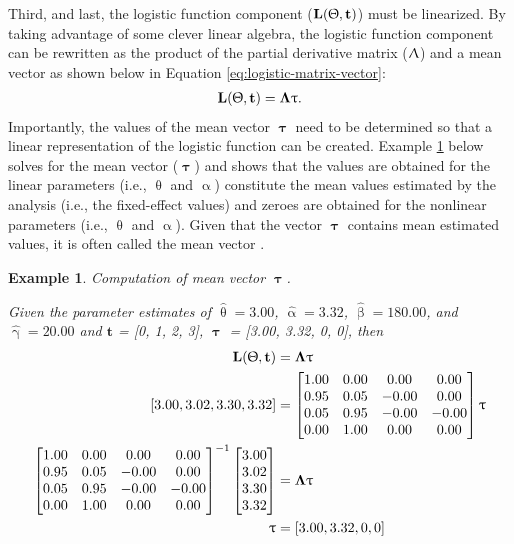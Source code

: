 \documentclass[
12pt, %
twoside,
english]{guelphthesis}
\newtheorem{example}{Example}
\begin{document}
Third, and last, the logistic function component (\(\mathbf{L(\Uptheta, t)}\)) must be linearized. By taking advantage of some clever linear algebra, the logistic function component can be rewritten as the product of the partial derivative matrix (\(\mathbf{\Uplambda}\)) and a mean vector \autocites[\(\mathbf{\uptau}\);][]{shapiro1987,browne1993} as shown below in Equation \ref{eq:logistic-matrix-vector}:
\begin{align}
 \mathbf{L(\Uptheta, t)} = \mathbf{\Lambda\uptau}.
\label{eq:logistic-matrix-vector}
\end{align}
\noindent Importantly, the values of the mean vector \(\mathbf{\uptau}\) need to be determined so that a linear representation of the logistic function can be created. Example \ref{exm:tau-vector} below solves for the mean vector (\(\mathbf{\uptau}\)) and shows that the values are obtained for the linear parameters (i.e., \(\uptheta\) and \(\upalpha\)) constitute the mean values estimated by the analysis (i.e., the fixed-effect values) and zeroes are obtained for the nonlinear parameters (i.e., \(\uptheta\) and \(\upalpha\)). Given that the vector \(\mathbf{\uptau}\) contains mean estimated values, it is often called the mean vector \autocite{blozis2004,preacher2015}.
\begin{example}
\protect\hypertarget{exm:tau-vector}{}\label{exm:tau-vector}Computation of mean vector \(\mathbf{\uptau}\).

\noindent \textup{Given the parameter estimates of $\hat{\uptheta} = 3.00$, $\hat{\upalpha} = 3.32$, $\hat{\upbeta} = 180.00$, and $\hat{\upgamma} = 20.00$ and $\mathbf{t}$ = [0, 1, 2, 3], $\mathbf{\uptau}$ = [3.00, 3.32, 0, 0], then }
\begin{align*}
\mathbf{L(\Uptheta, t)} &= \mathbf{\Lambda\uptau} \\ 
[3.00, 3.02, 3.30, 3.32] &= \begin{bmatrix}
1.00 & 0.00 & 0.00  & 0.00 \\ 
0.95  & 0.05 & -0.00 & 0.00 \\ 
0.05 & 0.95 & -0.00 & -0.00 \\ 
0.00 & 1.00  & 0.00 & 0.00 \\
\end{bmatrix} \mathbf{\uptau} \\ 
\begin{bmatrix}
1.00 & 0.00 & 0.00  & 0.00 \\ 
0.95  & 0.05 & -0.00 & 0.00 \\ 
0.05 & 0.95 & -0.00 & -0.00 \\ 
0.00 & 1.00  & 0.00 & 0.00 \\
\end{bmatrix}^{-1}
\begin{bmatrix} 
3.00 \\ 3.02 \\ 3.30 \\ 3.32
\end{bmatrix} &=  \mathbf{\Lambda\uptau} \\ 
 \mathbf{\uptau} &= [3.00, 3.32, 0, 0]\\
\end{align*}
\vspace*{-25mm}

\noindent \hrulefill
\end{example}
\end{document}
